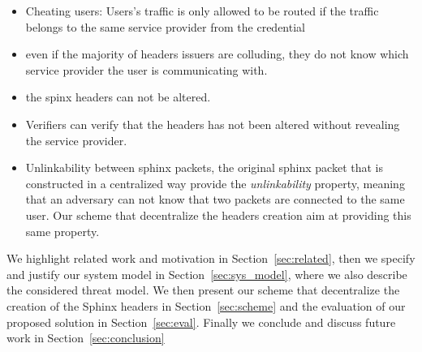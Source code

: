 \begin{itemize}
	\item Cheating users: Users's traffic is only allowed to be routed if the traffic belongs to the same service provider from the credential
	\item even if the majority of headers issuers are colluding, they do not know which service provider the user is communicating with.
	\item the spinx headers can not be altered.
	\item Verifiers can verify that the headers has not been altered without revealing the service provider.
	\item Unlinkability between  sphinx packets, the original sphinx packet that is constructed in a centralized way provide the \textit{unlinkability} property, meaning that an adversary can not know that two packets are connected to the same user. Our scheme that decentralize the headers creation aim at providing this same property.
\end{itemize}
We highlight related work and motivation in Section~\ref{sec:related}, then we specify and justify our system model in Section~\ref{sec:sys_model}, where we also describe the considered threat model. We then present our scheme that decentralize the creation of the Sphinx headers in Section~\ref{sec:scheme} and the evaluation of our proposed solution in Section~\ref{sec:eval}. Finally we conclude and discuss future work in Section~\ref{sec:conclusion}